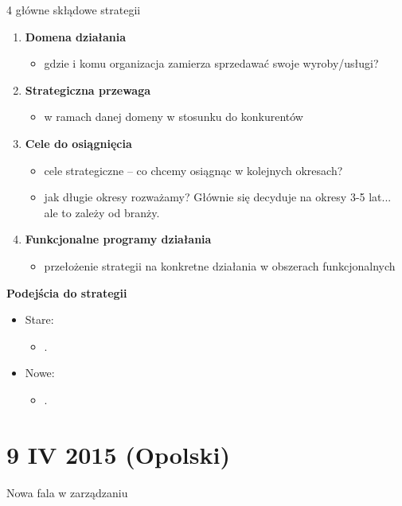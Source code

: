 \documentclass[a4paper,10pt]{report}
\begin{document}
4 główne skłądowe strategii
\begin{enumerate}
	\item \textbf{Domena działania}
	\begin{itemize}
		\item gdzie i komu organizacja zamierza sprzedawać swoje wyroby/usługi?
	\end{itemize} 
	\item \textbf{Strategiczna przewaga}
	\begin{itemize}
		\item w ramach danej domeny w stosunku do konkurentów
	\end{itemize}
	\item \textbf{Cele do osiągnięcia}
	\begin{itemize}
		\item cele strategiczne -- co chcemy osiągnąc w kolejnych okresach?
		\item jak długie okresy rozważamy? Głównie się decyduje na okresy 3-5 lat... ale to zależy od branży.
	\end{itemize}
	\item \textbf{Funkcjonalne programy działania}
	\begin{itemize}
		\item przełożenie strategii na konkretne działania w obszerach funkcjonalnych
	\end{itemize}
\end{enumerate}

\textbf{Podejścia do strategii}
\begin{itemize}
	\item Stare:
	\begin{itemize}
		\item .
	\end{itemize}
	\item Nowe:
	\begin{itemize}
		\item .
	\end{itemize}
\end{itemize}

\section{9 IV 2015 (Opolski)}

Nowa fala w zarządzaniu\\
\end{document}
